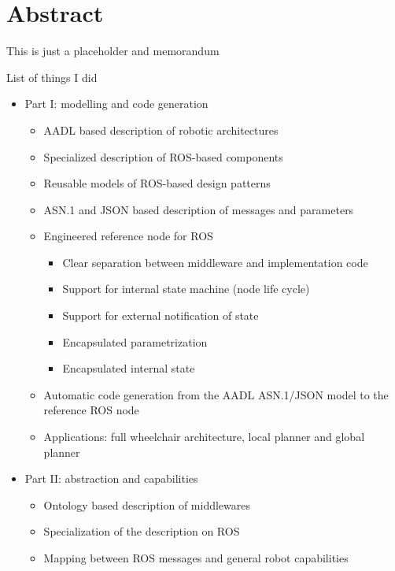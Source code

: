 \begingroup
\let\clearpage\relax
\let\cleardoublepage\relax
\let\cleardoublepage\relax

\chapter*{Abstract}
This is just a placeholder and memorandum

List of things I did
\begin{itemize}
	\item Part I: modelling and code generation
	\begin{itemize}
		\item AADL based description of robotic architectures
		\item Specialized description of ROS-based components
		\item Reusable models of ROS-based design patterns
		\item ASN.1 and JSON based description of messages and parameters
		\item Engineered reference node for ROS
		\begin{itemize}
			\item Clear separation between middleware and implementation code
			\item Support for internal state machine (node life cycle)
			\item Support for external notification of state
			\item Encapsulated parametrization
			\item Encapsulated internal state
		\end{itemize}
		\item Automatic code generation from the AADL ASN.1/JSON model to the reference ROS node
		\item Applications: full wheelchair architecture, local planner and global planner
	\end{itemize}
	\item Part II: abstraction and capabilities
	\begin{itemize}
		\item Ontology based description of middlewares
		\item Specialization of the description on ROS
		\item Mapping between ROS messages and general robot capabilities

\end{itemize}
\end{itemize}
